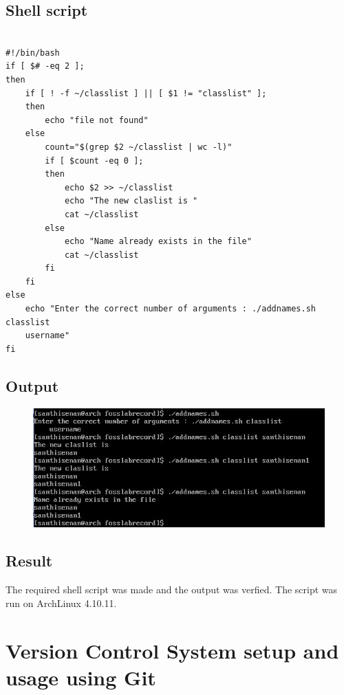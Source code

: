 \documentclass{article}
\begin{document}
\subsection{Shell script}
\begin{verbatim}

#!/bin/bash
if [ $# -eq 2 ];
then
    if [ ! -f ~/classlist ] || [ $1 != "classlist" ];
    then 
        echo "file not found"
    else
        count="$(grep $2 ~/classlist | wc -l)"
        if [ $count -eq 0 ];
        then 
            echo $2 >> ~/classlist
            echo "The new claslist is "
            cat ~/classlist
        else
            echo "Name already exists in the file"
            cat ~/classlist
        fi
    fi
else
    echo "Enter the correct number of arguments : ./addnames.sh classlist
    username"
fi

\end{verbatim}
\vfill

\subsection{Output}
\begin{figure}[h!]
	\includegraphics[width=\linewidth]{./outputs/addnamesnew.jpg}
\end{figure}


\subsection{Result}
The required shell script was made and the output was verfied. The script was run on ArchLinux 4.10.11.

\begin{refsection}
\cite{shellbible}
\cite{shellbook}
\printbibliography
\end{refsection}

\newpage

\section{Version Control System setup and usage using Git}
\end{document}
